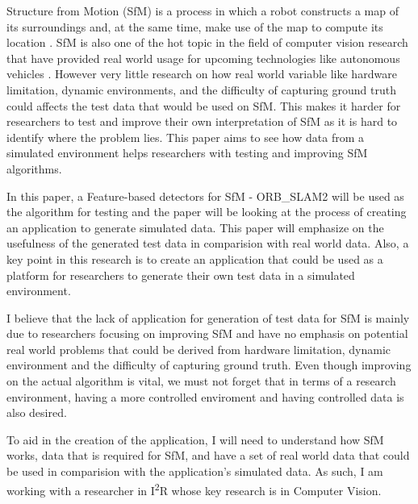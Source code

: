 Structure from Motion (SfM) is a process in which a robot constructs a map of its surroundings and, at the same time, make use of the map to compute its location \cite{forsyth2011computer}. SfM is also one of the hot topic in the field of computer vision research that have provided real world usage for upcoming technologies like autonomous vehicles \cite{kim2013real}. However very little research on how real world variable like hardware limitation, dynamic environments, and the difficulty of capturing ground truth could affects the test data that would be used on SfM. This makes it harder for researchers to test and improve their own interpretation of SfM as it is hard to identify where the problem lies. This paper aims to see how data from a simulated environment helps researchers with testing and improving SfM algorithms. 

In this paper, a Feature-based detectors for SfM - ORB\_SLAM2 \cite{lin2016repmatch} will be used as the algorithm for testing and the paper will be looking at the process of creating an application to generate simulated data. This paper will emphasize on the usefulness of the generated test data in comparision with real world data. Also, a key point in this research is to create an application that could be used as a platform for researchers to generate their own test data in a simulated environment.

I believe that the lack of application for generation of test data for SfM is mainly due to researchers focusing on improving SfM and have no emphasis on potential real world problems that could be derived from hardware limitation, dynamic environment and the difficulty of capturing ground truth. Even though improving on the actual algorithm is vital, we must not forget that in terms of a research environment, having a more controlled enviroment and having controlled data is also desired.

To aid in the creation of the application, I will need to understand how SfM works, data that is required for SfM, and have a set of real world data that could be used in comparision with the application's simulated data. As such, I am working with a researcher in I\textsuperscript{2}R whose key research is in Computer Vision.